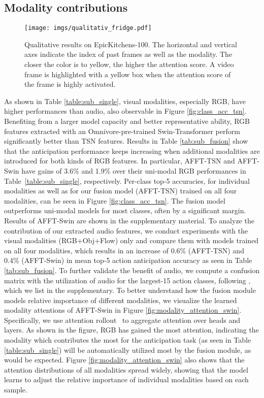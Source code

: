 \documentclass[10pt,twocolumn,letterpaper,dvipsnames]{article}
\newcommand{\sname}{AFFT}
\begin{document}
\subsection{Modality contributions}
\label{sec:ablation-modalities}
\begin{figure}[t]
   \centering
\texttt{[image: imgs/qualitativ\_fridge.pdf]}
     \caption{Qualitative results on EpicKitchens-100. The horizontal and vertical axes indicate the index of past frames as well as the modality. The closer the color is to yellow, the higher the attention score. A video frame is highlighted  with a yellow box when the attention score of the frame is highly activated.}
     \label{fig:fridge-attention}
\end{figure}

As shown in Table \ref{table:sub_single}, visual modalities, especially RGB, have higher performances than audio, also observable in Figure \ref{fig:class_acc_tsn}. Benefiting from a larger model capacity and better representative ability, RGB features extracted with an Omnivore-pre-trained Swin-Transformer perform significantly better than TSN features.
Results in Table \ref{tab:sub_fusion} show that the anticipation performance keeps increasing when additional modalities are introduced for both kinds of RGB features. In particular, \sname-TSN and \sname-Swin have gains of 3.6\% and 1.9\% over their uni-modal RGB performances in Table~\ref{table:sub_single}, respectively.
Per-class top-5 accuracies, for individual modalities as well as for our fusion model (\sname-TSN) trained on all four modalities, can be seen in Figure \ref{fig:class_acc_tsn}. The fusion model outperforms uni-modal models for most classes, often by a significant margin. Results of \sname-Swin are shown in the supplementary material.
To analyze the contribution of our extracted audio features, we conduct experiments with the visual modalities (RGB+Obj+Flow) only and compare them with models trained on all four modalities, which results in an increase of 0.6\% (\sname-TSN) and 0.4\% (\sname-Swin) in mean top-5 action anticipation accuracy as seen in Table \ref{tab:sub_fusion}. To further validate the benefit of audio, we compute a confusion matrix with the utilization of audio for the largest-15 action classes, following \cite{kazakosEPICFusionAudioVisualTemporal2019}, which we list in the supplementary.
To better understand how the fusion module models relative importance of different modalities, we visualize the learned modality attentions of \sname-Swin in Figure \ref{fig:modality_attention_swin}. Specifically, we use attention rollout~\cite{abnar2020quantifying} to aggregate attention over heads and layers. As shown in the figure, RGB has gained the most attention, indicating the modality which contributes the most for the anticipation task (as seen in Table \ref{table:sub_single}) will be automatically utilized most by the fusion module, as would be expected. Figure \ref{fig:modality_attention_swin} also shows that the attention distributions of all modalities spread widely, showing that the model learns to adjust the relative importance of individual modalities based on each sample.
\end{document}

